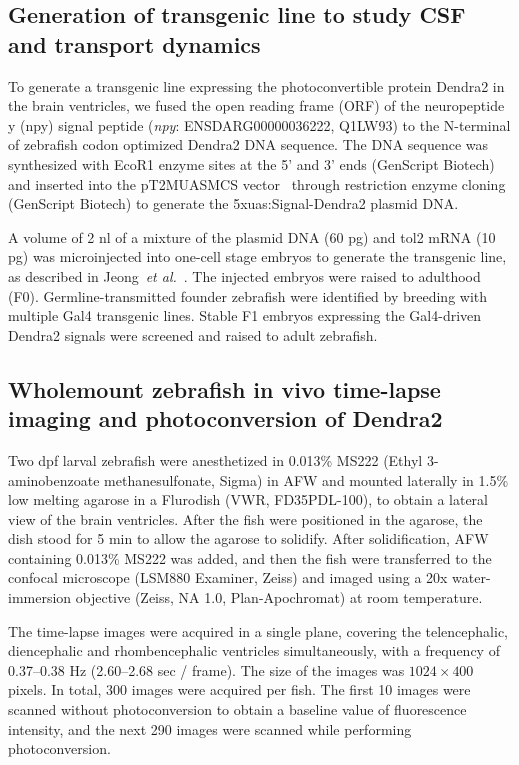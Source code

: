 \documentclass{WileyMSP-template}
\begin{document}
\subsection{Generation of transgenic line to study CSF and transport dynamics} 
To generate a transgenic line expressing the photoconvertible protein Dendra2 in
the brain ventricles, we fused the open reading frame (ORF)
of the neuropeptide y (npy) signal peptide
(\emph{npy}: ENSDARG00000036222, Q1LW93) to the N-terminal of
zebrafish codon optimized Dendra2 DNA sequence.
The DNA sequence was synthesized with EcoR1 enzyme sites at the 5’ and
3’ ends (GenScript Biotech) and inserted into the
pT2MUASMCS vector~\cite{Asakawa2008GeneticZebrafish}
through restriction enzyme cloning (GenScript Biotech)
to generate the 5xuas:Signal-Dendra2 plasmid DNA.

A volume of 2 nl of a mixture of the plasmid DNA (60 pg) and tol2 mRNA (10 pg)
was microinjected into one-cell stage embryos to generate the transgenic line,
as described in Jeong~\emph{et al.}~\cite{Jeong2024TheZebrafish}. The injected
embryos were raised to adulthood (F0).
Germline-transmitted founder zebrafish were identified by breeding with
multiple Gal4 transgenic lines. Stable F1 embryos expressing the Gal4-driven
Dendra2 signals were screened and raised to adult zebrafish.

\subsection{Wholemount zebrafish in vivo time-lapse imaging and photoconversion of Dendra2}
Two dpf larval zebrafish were anesthetized in 0.013\% MS222
(Ethyl 3-aminobenzoate methanesulfonate, Sigma) in AFW and
mounted laterally in 1.5\% low melting agarose in a Flurodish (VWR, FD35PDL-100),
to obtain a lateral view of the brain ventricles. After the
fish were positioned in the agarose, the dish stood for 5 min to allow the agarose to solidify.
After solidification, AFW containing 0.013\% MS222 was added,
and then the fish were transferred to the confocal microscope (LSM880 Examiner, Zeiss)
and imaged using a 20x water-immersion objective (Zeiss, NA 1.0, Plan-Apochromat)
at room temperature.

The time-lapse images were acquired in a single plane, covering the
telencephalic, diencephalic and rhombencephalic ventricles simultaneously,
with a frequency of 0.37--0.38 Hz (2.60--2.68 sec / frame). The size
of the images was $1024\times400$ pixels. In total, 300 images were acquired per fish.
The first 10 images were scanned without photoconversion to obtain a
baseline value of fluorescence intensity, and the next 290 images were
scanned while performing photoconversion. 
\end{document}
